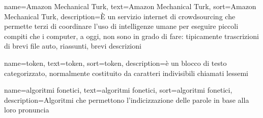 {
    name=Amazon Mechanical Turk,
    text=Amazon Mechanical Turk,
    sort=Amazon Mechanical Turk,
    description={È un servizio internet di crowdsourcing che permette terzi di coordinare l'uso di intelligenze umane per eseguire piccoli compiti che i computer, a oggi, non sono in grado di fare: tipicamente trascrizioni di brevi file auto, riassunti, brevi descrizioni}
}

{
    name=token,
    text=token,
    sort=token,
    description={è un blocco di testo categorizzato, normalmente costituito da caratteri indivisibili chiamati lessemi}
}

{
    name=algoritmi fonetici,
    text=algoritmi fonetici,
    sort=algoritmi fonetici,
    description={Algoritmi che permettono l'indicizzazione delle parole in base alla loro pronuncia}
}
